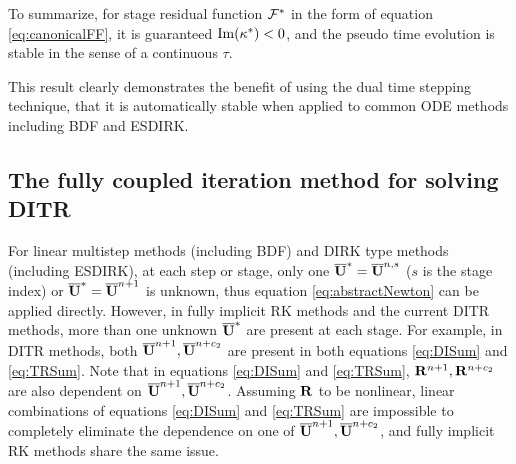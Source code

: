 To summarize, for stage residual function $\mathcal{F}^*$ in the form of
equation \eqref{eq:canonicalFF}, it is guaranteed $\mathrm{Im} (\kappa^*) < 0$,
and the pseudo time evolution is stable in the sense of a continuous $\tau$.

This result clearly demonstrates the benefit of using the dual time stepping
technique,
that it is automatically stable when applied to common ODE methods including
BDF and ESDIRK.


\subsection{The fully coupled iteration method for solving DITR}

For linear multistep methods (including BDF) and DIRK type methods (including ESDIRK),
at each step or stage, only one $\overline{\mathbf{U}}^{*}=\overline{\mathbf{U}}^{n,s}$
($s$ is the stage index) or $\overline{\mathbf{U}}^{*}=\overline{\mathbf{U}}^{n+1}$ is unknown,
thus equation \eqref{eq:abstractNewton} can be applied directly.
However, in fully implicit RK methods and the current DITR methods,
more than one unknown $\overline{\mathbf{U}}^{*}$ are present at each stage.
For example, in DITR methods, both $\overline{\mathbf{U}}^{n+1},\overline{\mathbf{U}}^{n+c_2}$
are present in both equations \eqref{eq:DISum} and \eqref{eq:TRSum}.
Note that in equations \eqref{eq:DISum} and \eqref{eq:TRSum},
$\mathbf{R}^{n+1},\mathbf{R}^{n+c_2}$ are also dependent on $\overline{\mathbf{U}}^{n+1},\overline{\mathbf{U}}^{n+c_2}$.
Assuming $\mathbf{R}$ to be nonlinear, linear combinations of
equations \eqref{eq:DISum} and \eqref{eq:TRSum} are
impossible to completely eliminate
the dependence on one of $\overline{\mathbf{U}}^{n+1},\overline{\mathbf{U}}^{n+c_2}$, and
fully implicit RK methods share the same issue.

